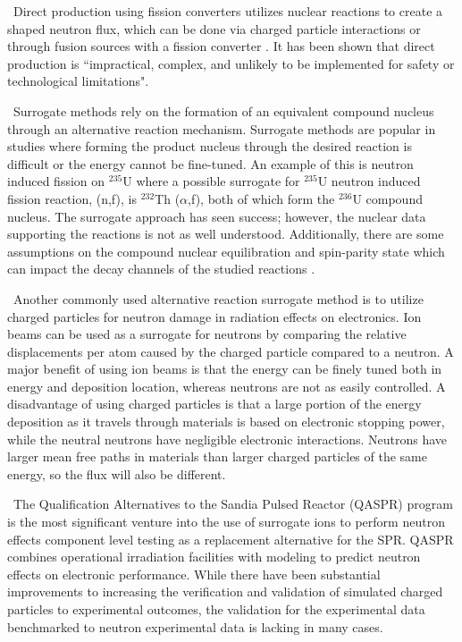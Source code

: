 \ Direct production using fission converters utilizes nuclear reactions to create a shaped neutron flux, which can be done via charged particle interactions or through fusion sources with a fission converter \cite{edsstc.32099219990101}. 
It has been shown that direct production is ``impractical, complex, and unlikely to be implemented for safety or technological limitations"\cite{Bevins}. 

\ Surrogate methods rely on the formation of an equivalent compound nucleus through an alternative reaction mechanism\cite{DIETRICH2007237,Scielzo2012}. 
Surrogate methods are popular in studies where forming the product nucleus through the desired reaction is difficult or the energy cannot be fine-tuned. 
An example of this is neutron induced fission on $\mathrm{^{235}}$U where a possible surrogate for $\mathrm{^{235}}$U neutron induced fission reaction, (n,f), is $\mathrm{^{232}}$Th ($\alpha$,f), both of which form the $\mathrm{^{236}}$U compound nucleus. 
The surrogate approach has seen success; however, the nuclear data supporting the reactions is not as well understood\cite{RevModPhys.84.353,Narek1}. 
Additionally, there are some assumptions on the compound nuclear equilibration and spin-parity state which can impact the decay channels of the studied reactions \cite{DIETRICH2007237}.

\ Another commonly used alternative reaction surrogate method is to utilize charged particles for neutron damage in radiation effects on electronics. 
Ion beams can be used as a surrogate for neutrons by comparing the relative displacements per atom caused by the charged particle compared to a neutron\cite{Galy2018}. 
A major benefit of using ion beams is that the energy can be finely tuned both in energy and deposition location, whereas neutrons are not as easily controlled. 
A disadvantage of using charged particles is that a large portion of the energy deposition as it travels through materials is based on electronic stopping power, while the neutral neutrons have negligible electronic interactions. 
Neutrons have larger mean free paths in materials than larger charged particles of the same energy, so the flux will also be different. 

\ The Qualification Alternatives to the Sandia Pulsed Reactor (QASPR) program is the most significant venture into the use of surrogate ions to perform neutron effects component level testing as a replacement alternative for the SPR\cite{JointDefenseScienceBoard/ThreatReductionAdvisoryComitteeTaskForce2010}. 
QASPR combines operational irradiation facilities with modeling to predict neutron effects on electronic performance. 
While there have been substantial improvements to \mbox{increasing} the verification and validation of simulated charged particles to experimental outcomes, the validation for the experimental data benchmarked to neutron experimental data is lacking in many cases\cite{Bouchard}.

